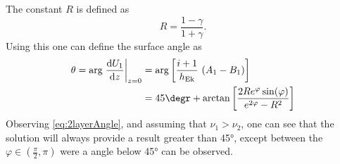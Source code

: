 The constant $R$ is defined as 
\begin{equation}
    R = \frac{1-\gamma}{1+\gamma}.
\end{equation}
Using this one can define the surface angle as 
\begin{align}
    \theta=\arg \left.\frac{\mathrm{d} U_1}{\mathrm{d} z}\right|_{z=0} &= \arg\left[\frac{i+1}{h_\text{Ek}}\,\left(A_1-B_1\right)\right] \\
    &=45\degr + 
    \arctan\left[\frac{2R e^{\varphi}\sin(\varphi)}{e^{2\varphi} -R^2}\right]
    \label{eq:2layerAngle}
\end{align}
Observing \autoref{eq:2layerAngle}, and assuming that $\nu_1>\nu_2$, one can see that the solution will always provide a result greater than \ang{45}, except between the $\varphi\in\left(\tfrac{\pi}{2},\pi\right)$ were a angle below \ang{45} can be observed.

